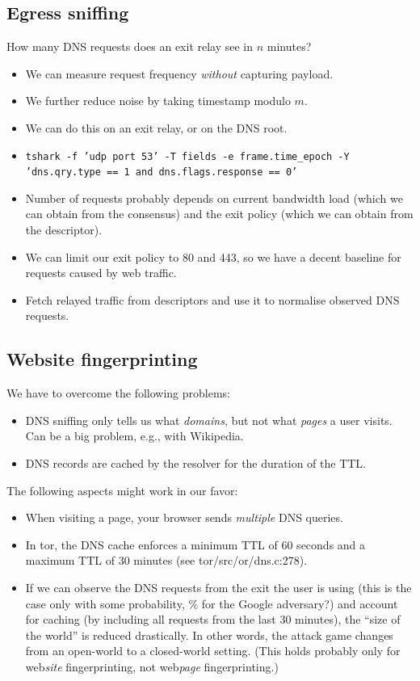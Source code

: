 \subsection{Egress sniffing}

How many DNS requests does an exit relay see in $n$ minutes?
\begin{itemize}
	\item We can measure request frequency \emph{without} capturing payload.
	\item We further reduce noise by taking timestamp modulo $m$.
	\item We can do this on an exit relay, or on the DNS root.
	\item \texttt{tshark -f 'udp port 53' -T fields -e frame.time\_epoch -Y 'dns.qry.type == 1 and dns.flags.response == 0'}
	\item Number of requests probably depends on current bandwidth load (which
		we can obtain from the consensus) and the exit policy (which we can
		obtain from the descriptor).
	\item We can limit our exit policy to 80 and 443, so we have a decent
		baseline for requests caused by web traffic.
	\item Fetch relayed traffic from descriptors and use it to normalise
		observed DNS requests.
\end{itemize}

\subsection{Website fingerprinting}
We have to overcome the following problems:
\begin{itemize}
	\item DNS sniffing only tells us what \emph{domains}, but not what
		\emph{pages} a user visits.  Can be a big problem, e.g., with Wikipedia.
	\item DNS records are cached by the resolver for the duration of the TTL.
\end{itemize}

The following aspects might work in our favor:
\begin{itemize}
	\item When visiting a page, your browser sends \emph{multiple} DNS queries.
	\item In tor, the DNS cache enforces a minimum TTL of 60 seconds and a maximum
	TTL of 30 minutes (see tor/src/or/dns.c:278).
	\item If we can observe the DNS requests from the exit the user is
	using (this is the case only with some probability, \% for
	the Google adversary?) and account for caching (by including all
	requests from the last 30 minutes), the ``size of the world'' is
	reduced drastically. In other words, the attack game changes from an
	open-world to a closed-world setting. (This holds probably only for
	web\emph{site} fingerprinting, not web\emph{page} fingerprinting.)
\end{itemize}


